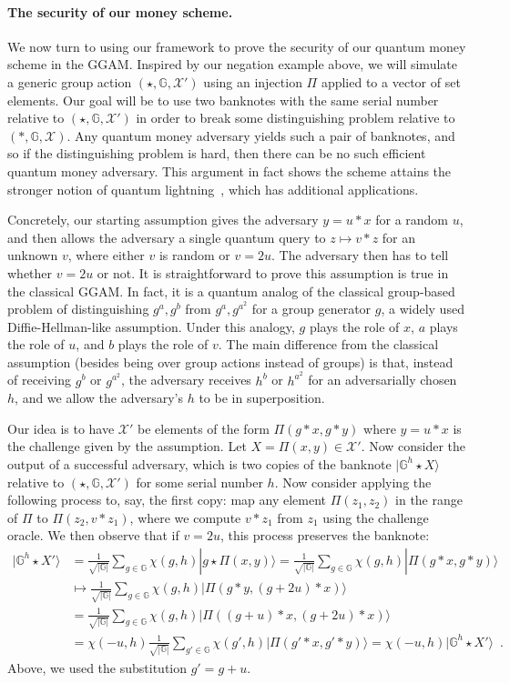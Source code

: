 \documentclass{article}\usepackage[a4paper,margin=20mm]{geometry}
\numberwithin{theorem}{section}
\numberwithin{equation}{section}
\newcommand{\G}{\mathbb{G}}
\newcommand{\Xs}{{\mathcal{X}}}
\begin{document}
\paragraph{The security of our money scheme.} We now turn to using our framework to prove the security of our quantum money scheme in the GGAM. Inspired by our negation example above, we will simulate a generic group action $(\star,\G,\Xs')$ using an injection $\Pi$ applied to a vector of set elements. Our goal will be to use two banknotes with the same serial number relative to $(\star,\G,\Xs')$ in order to break some distinguishing problem relative to $(*,\G,\Xs)$. Any quantum money adversary yields such a pair of banknotes, and so if the distinguishing problem is hard, then there can be no such efficient quantum money adversary. This argument in fact shows the scheme attains the stronger notion of quantum lightning~\cite{DBLP:journals/joc/Zhandry21}, which has additional applications.

Concretely, our starting assumption gives the adversary $y=u*x$ for a random $u$, and then allows the adversary a single quantum query to $z\mapsto v*z$ for an unknown $v$, where either $v$ is random or $v=2u$. The adversary then has to tell whether $v=2u$ or not. It is straightforward to prove this assumption is true in the classical GGAM. In fact, it is a quantum analog of the classical group-based problem of distinguishing $g^a,g^b$ from $g^a,g^{a^2}$ for a group generator $g$, a widely used Diffie-Hellman-like assumption. Under this analogy, $g$ plays the role of $x$, $a$ plays the role of $u$, and $b$ plays the role of $v$. The main difference from the classical assumption (besides being over group actions instead of groups) is that, instead of receiving $g^b$ or $g^{a^2}$, the adversary receives $h^b$ or $h^{a^2}$ for an adversarially chosen $h$, and we allow the adversary's $h$ to be in superposition.

Our idea is to have $\Xs'$ be elements of the form $\Pi(g*x,g*y)$ where $y=u*x$ is the challenge given by the assumption. Let $X=\Pi(x,y)\in\Xs'$. Now consider the output of a successful adversary, which is two copies of the banknote $|\G^h\star X\rangle$ relative to $(\star,\G,\Xs')$ for some serial number $h$. Now consider applying the following process to, say, the first copy: map any element $\Pi(z_1,z_2)$ in the range of $\Pi$ to $\Pi(z_2,v*z_1)$, where we compute $v*z_1$ from $z_1$ using the challenge oracle. We then observe that if $v=2u$, this process preserves the banknote:
\begin{align*}
	|\G^h\star X'\rangle&=\frac{1}{\sqrt{|\G|}}\sum_{g\in\G}\chi(g,h)|g\star \Pi(x,y)\rangle=\frac{1}{\sqrt{|\G|}}\sum_{g\in\G}\chi(g,h)|\Pi(g*x,g*y)\rangle\\
	&\mapsto\frac{1}{\sqrt{|\G|}}\sum_{g\in\G}\chi(g,h)|\Pi(g*y,(g+2u)*x)\rangle\\
	&=\frac{1}{\sqrt{|\G|}}\sum_{g\in\G}\chi(g,h)|\Pi((g+u)*x,(g+2u)*x)\rangle\\
	&=\chi(-u,h)\frac{1}{\sqrt{|\G|}}\sum_{g'\in\G}\chi(g',h)|\Pi(g'*x,g'*y)\rangle=\chi(-u,h)|\G^h\star X'\rangle\enspace .
\end{align*}
Above, we used the substitution $g'=g+u$.
\end{document}
